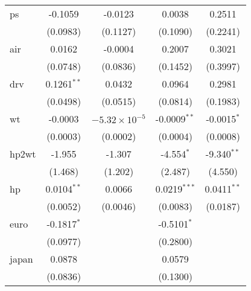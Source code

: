 \begin{table}[htbp]
\begin{tabular}{lcccc}
      ps                                         & -0.1059         & -0.0123                & 0.0038                 & 0.2511\\   
                                                 & (0.0983)        & (0.1127)               & (0.1090)               & (0.2241)\\   
      air                                        & 0.0162          & -0.0004                & 0.2007                 & 0.3021\\   
                                                 & (0.0748)        & (0.0836)               & (0.1452)               & (0.3997)\\   
      drv                                        & 0.1261$^{**}$   & 0.0432                 & 0.0964                 & 0.2981\\   
                                                 & (0.0498)        & (0.0515)               & (0.0814)               & (0.1983)\\   
      wt                                         & -0.0003         & $-5.32\times 10^{-5}$  & -0.0009$^{**}$         & -0.0015$^{*}$\\   
                                                 & (0.0003)        & (0.0002)               & (0.0004)               & (0.0008)\\   
      hp2wt                                      & -1.955          & -1.307                 & -4.554$^{*}$           & -9.340$^{**}$\\   
                                                 & (1.468)         & (1.202)                & (2.487)                & (4.550)\\   
      hp                                         & 0.0104$^{**}$   & 0.0066                 & 0.0219$^{***}$         & 0.0411$^{**}$\\   
                                                 & (0.0052)        & (0.0046)               & (0.0083)               & (0.0187)\\   
      euro                                       & -0.1817$^{*}$   &                        & -0.5101$^{*}$          &   \\   
                                                 & (0.0977)        &                        & (0.2800)               &   \\   
      japan                                      & 0.0878          &                        & 0.0579                 &   \\   
                                                 & (0.0836)        &                        & (0.1300)               &   \\   

\end{tabular}
\end{table}
